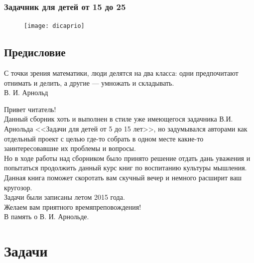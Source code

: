 \section*{Задачник для детей от 15 до 25}
\begin{figure}[ht!]
    \centering
    \texttt{[image: dicaprio]}
\end{figure}

\chapter*{Предисловие}

\begin{flushright}
{\scriptsize С точки зрения математики, люди делятся на два класса: одни предпочитают отнимать и делить, а другие — умножать и складывать.\\
В. И. Арнольд}
\end{flushright}

Привет читатель!\\

Данный сборник хоть и выполнен в стиле уже имеющегося задачника
В.И. Арнольда <<Задачи для детей от 5 до 15 лет>>, но задумывался
авторами как отдельный проект с целью где-то собрать в одном месте
какие-то заинтересовавшие их проблемы и вопросы.\\

Но в ходе работы над сборником было принято решение отдать дань
уважения и попытаться продолжить данный курс книг по воспитанию
культуры мышления.\\

Данная книга поможет скоротать вам скучный вечер и немного расширит ваш кругозор.\\

Задачи были записаны летом 2015 года.\\

Желаем вам приятного времяпреповождения!\\

В память о В. И. Арнольде.\\


\part{Задачи}
